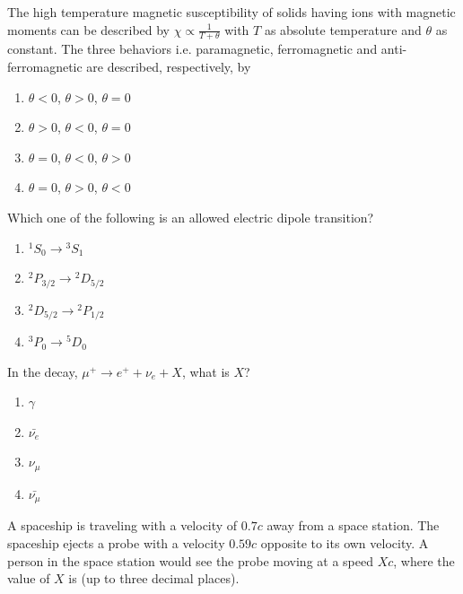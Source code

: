 \item The high temperature magnetic susceptibility of solids having ions with magnetic moments can be described by $\chi \propto \frac{1}{T + \theta}$ with $T$ as absolute temperature and $\theta$ as constant. The three behaviors i.e. paramagnetic, ferromagnetic and anti-ferromagnetic are described, respectively, by
\begin{multicols}{2}
\begin{enumerate}
    \item $\theta < 0$, $\theta > 0$, $\theta = 0$
    \item $\theta > 0$, $\theta < 0$, $\theta = 0$
    \item $\theta = 0$, $\theta < 0$, $\theta > 0$
    \item $\theta = 0$, $\theta > 0$, $\theta < 0$
\end{enumerate}
\end{multicols}

\bigskip

\item Which one of the following is an allowed electric dipole transition?
\begin{multicols}{2}
\begin{enumerate}
    \item ${}^1 S_0 \rightarrow {}^3 S_1$
    \item ${}^2 P_{3/2} \rightarrow {}^2 D_{5/2}$
    \item ${}^2 D_{5/2} \rightarrow {}^2 P_{1/2}$
    \item ${}^3 P_0 \rightarrow {}^5 D_0$
\end{enumerate}
\end{multicols}

\bigskip

\item In the decay, $\mu^+ \rightarrow e^+ + \nu_e + X$, what is $X$?
\begin{multicols}{2}
\begin{enumerate}
    \item $\gamma$
    \item $\bar{\nu_e}$
    \item $\nu_\mu$
    \item $\bar{\nu_\mu}$
\end{enumerate}
\end{multicols}

\bigskip

\item A spaceship is traveling with a velocity of $0.7 c$ away from a space station. The spaceship ejects a probe with a velocity $0.59 c$ opposite to its own velocity. A person in the space station would see the probe moving at a speed $X c$, where the value of $X$ is \underline{\hspace{2cm}} (up to three decimal places).

